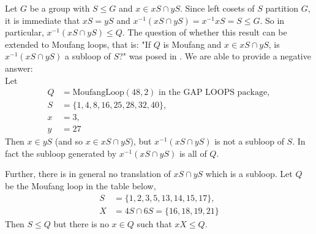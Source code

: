 \documentclass[12pt, twoside, openright]{report}
\theoremstyle{definition}
\begin{document}
Let $G$ be a group with $S\leq G$ and $x\in xS\cap yS$. Since left cosets of $S$ partition $G$,
  it is immediate that $xS = yS$ and $x^{-1}(xS\cap yS) = x^{-1}xS = S\leq G$. So in particular,
  $x^{-1}(xS \cap yS) \leq Q$. The question of whether this result can be extended to Moufang
  loops, that is: "If $Q$ is Moufang and $x\in xS\cap yS$, is $x^{-1}(xS\cap yS)$ a subloop of
  $S$?" was posed in \cite{incidence}. We are able to provide a negative answer:\\ 
Let 
  \begin{align*}
    Q &= \text{MoufangLoop}(48, 2)\text{ in the GAP LOOPS package},\\
    S &= \{1,4,8,16,25,28,32,40\},\\
    x &= 3,\\
    y &= 27
  \end{align*}
Then $x\in yS$ (and so $x\in xS\cap yS$), but $x^{-1}(xS\cap yS)$ is not a subloop of $S$. In fact
  the subloop generated by $x^{-1}(xS\cap yS)$ is all of $Q$.

Further, there is in general no translation of $xS\cap yS$ which is a subloop. Let $Q$ be
  the Moufang loop in the table below, 
  \begin{align*}
    S &= \{1, 2, 3, 5, 13, 14, 15, 17\},\\
    X &= 4S\cap 6S = \{16, 18, 19, 21\}
  \end{align*}
Then $S\leq Q$ but there is no $x\in Q$ such that $xX\leq Q$.
\end{document}
